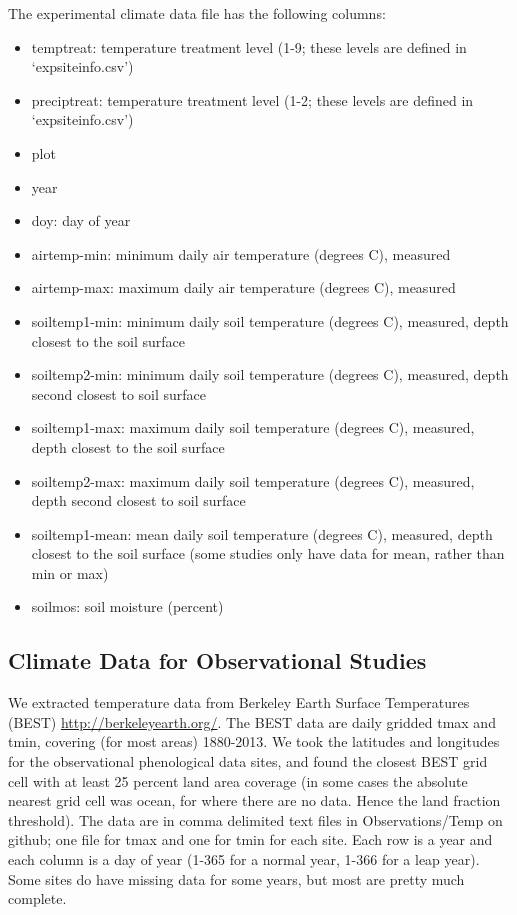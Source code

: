 \documentclass{article}
\begin{document}
The experimental climate data file has the following columns:
\begin{itemize}
  \item temptreat: temperature treatment level (1-9; these levels are defined in `expsiteinfo.csv')
 \item preciptreat: temperature treatment level (1-2; these levels are defined in `expsiteinfo.csv')
 \item plot
 \item year
 \item doy: day of year
 \item airtemp-min: minimum daily air temperature (degrees C), measured
 \item airtemp-max: maximum daily air temperature (degrees C), measured
 \item soiltemp1-min: minimum daily soil temperature (degrees C), measured, depth closest to the soil surface
 \item soiltemp2-min: minimum daily soil temperature (degrees C), measured, depth second closest to soil surface
 \item soiltemp1-max: maximum daily soil temperature (degrees C), measured, depth closest to the soil surface
 \item soiltemp2-max: maximum daily soil temperature (degrees C), measured, depth second closest to soil surface
 \item soiltemp1-mean: mean daily soil temperature (degrees C), measured, depth closest to the soil surface (some studies only have data for mean, rather than min or max)
 \item soilmos: soil moisture (percent)
 
\end{itemize}

\subsection{Climate Data for Observational Studies}

We extracted temperature data from Berkeley Earth Surface Temperatures (BEST) \url{http://berkeleyearth.org/}. The BEST data are daily gridded tmax and tmin, covering (for most areas) 1880-2013. We took the latitudes and longitudes for the observational phenological data sites, and found the closest BEST grid cell with at least 25 percent land area coverage (in some cases the absolute nearest grid cell was ocean, for where there are no data. Hence the land fraction threshold). The data are in comma delimited text files in Observations/Temp on github; one file for tmax and one for tmin for each site. Each row is a year and each column is a day of year (1-365 for a normal year, 1-366 for a leap year). Some sites do have missing data for some years, but most are pretty much complete.
\end{document}
